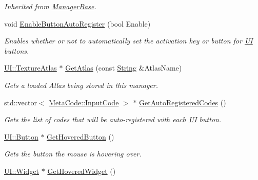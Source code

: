 \begin{DoxyCompactItemize}
\begin{DoxyCompactList}\small\item\em Inherited from \hyperlink{classMezzanine_1_1ManagerBase}{ManagerBase}. \item\end{DoxyCompactList}\item 
void \hyperlink{classMezzanine_1_1UIManager_a5dda002532786846f076ed9c685af2f5}{EnableButtonAutoRegister} (bool Enable)
\begin{DoxyCompactList}\small\item\em Enables whether or not to automatically set the activation key or button for \hyperlink{namespaceMezzanine_1_1UI}{UI} buttons. \item\end{DoxyCompactList}\item 
\hyperlink{classMezzanine_1_1UI_1_1TextureAtlas}{UI::TextureAtlas} $\ast$ \hyperlink{classMezzanine_1_1UIManager_a904d4d7a3957a13cf5e27e8d97dd1add}{GetAtlas} (const \hyperlink{namespaceMezzanine_acf9fcc130e6ebf08e3d8491aebcf1c86}{String} \&AtlasName)
\begin{DoxyCompactList}\small\item\em Gets a loaded Atlas being stored in this manager. \item\end{DoxyCompactList}\item 
std::vector$<$ \hyperlink{classMezzanine_1_1MetaCode_a3b5633f0145bf3287cf53a3f05b5563c}{MetaCode::InputCode} $>$ $\ast$ \hyperlink{classMezzanine_1_1UIManager_ab8e71134409a4375236f866774d61fcf}{GetAutoRegisteredCodes} ()
\begin{DoxyCompactList}\small\item\em Gets the list of codes that will be auto-\/registered with each \hyperlink{namespaceMezzanine_1_1UI}{UI} button. \item\end{DoxyCompactList}\item 
\hyperlink{classMezzanine_1_1UI_1_1Button}{UI::Button} $\ast$ \hyperlink{classMezzanine_1_1UIManager_a2430f2ea7e8ca90f320c9205a871fda3}{GetHoveredButton} ()
\begin{DoxyCompactList}\small\item\em Gets the button the mouse is hovering over. \item\end{DoxyCompactList}\item 
\hyperlink{classMezzanine_1_1UI_1_1Widget}{UI::Widget} $\ast$ \hyperlink{classMezzanine_1_1UIManager_ac4a7e054c5a5e52d37f1ff38f5328e9e}{GetHoveredWidget} ()

\end{DoxyCompactItemize}
